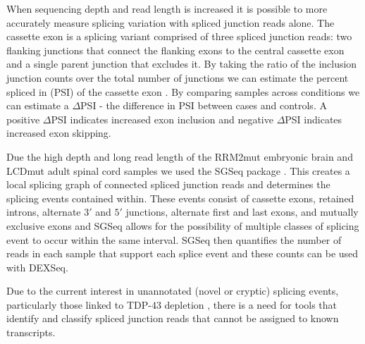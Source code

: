 When sequencing depth and read length is increased it is possible to more accurately measure splicing variation with spliced junction reads alone. The cassette exon is a splicing variant comprised of three spliced junction reads: two flanking junctions that connect the flanking exons to the central cassette exon and a single parent junction that excludes it. By taking the ratio of the inclusion junction counts over the total number of junctions we can estimate the percent spliced in (PSI) of the cassette exon \citep{Katz2010-ir}. By comparing samples across conditions we can estimate a $\Delta$PSI - the difference in PSI between cases and controls. A positive $\Delta$PSI indicates increased exon inclusion and negative $\Delta$PSI indicates increased exon skipping. 

Due the high depth and long read length of the RRM2mut embryonic brain and LCDmut adult spinal cord samples we used the SGSeq package \citep{Goldstein2016}. This creates a local splicing graph of connected spliced junction reads and determines the splicing events contained within. These events consist of cassette exons, retained introns, alternate $3'$ and $5'$ junctions, alternate first and last exons, and mutually exclusive exons and SGSeq allows for the possibility of multiple classes of splicing event to occur within  the same interval. SGSeq  then quantifies  the number of  reads in each sample  that support each splice event and these counts can be used with DEXSeq. 

Due to the current interest in unannotated (novel or cryptic) splicing events, particularly those linked to TDP-43 depletion \citep{Humphrey2017, Ling2015}, there is a need for tools that identify and classify spliced junction reads that cannot be assigned to known transcripts. 



